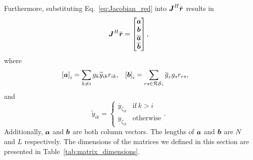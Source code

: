 \documentclass[useAMS,usenatbib]{mn2e}
\newcommand{\br}{\bmath{r}}
\newcommand{\bJ}{\bmath{J}}
\newcommand{\ba}{\bmath{a}}
\newcommand{\bb}{\bmath{b}}
\newcommand{\conj}[1]{\overline{#1}}
\begin{document}
Furthermore, substituting Eq.~\eqref{eq:Jacobian_red} into $\bJ^H\breve{\br}$ results in
\begin{equation}
\bJ^H\breve{\br} = \begin{bmatrix}
                   \ba \\
                   \bb \\
                   \conj{\ba}\\
                   \conj{\bb}
                   \end{bmatrix},
\end{equation}
where
\begin{align}
\label{eq:ab}
\left [ \ba \right ]_i &= \sum_{k\neq i} g_k \widetilde{y}_{ik}r_{ik},  & \left [ \bb \right ]_i &= \sum_{rs\in\mathcal{RS}_i}\conj{g}_r g_s r_{rs},
\end{align}
and
\begin{equation}
\widetilde{y}_{ik} = 
\begin{cases}
\conj{y}_{\zeta_{ik}} & \textrm{if}~k > i\\
y_{\zeta_{ik}} & \textrm{otherwise}
\end{cases}.
\end{equation}
Additionally, $\ba$ and $\bb$ are both column vectors. The lengths of $\ba$ and $\bb$ are $N$ and $L$ respectively.
The dimensions of the matrices we defined in this section are presented in Table~\ref{tab:matrix_dimensions}.

\end{document}
